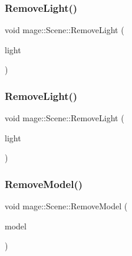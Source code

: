 \subsubsection{\texorpdfstring{Remove\+Light()}{RemoveLight()}\hspace{0.1cm}{\footnotesize\ttfamily [1/2]}}
{\footnotesize\ttfamily void mage\+::\+Scene\+::\+Remove\+Light (\begin{DoxyParamCaption}\item[{\hyperlink{namespacemage_a1e01ae66713838a7a67d30e44c67703e}{Shared\+Ptr}$<$ \hyperlink{namespacemage_a1724c6e6b6b5ba535cdd967cbbb4a669}{Omni\+Light\+Node} $>$}]{light }\end{DoxyParamCaption})\hspace{0.3cm}{\ttfamily [private]}}

\hypertarget{classmage_1_1_scene_a371c31d030990b9fa641271c4c733d87}{}\label{classmage_1_1_scene_a371c31d030990b9fa641271c4c733d87} 
\subsubsection{\texorpdfstring{Remove\+Light()}{RemoveLight()}\hspace{0.1cm}{\footnotesize\ttfamily [2/2]}}
{\footnotesize\ttfamily void mage\+::\+Scene\+::\+Remove\+Light (\begin{DoxyParamCaption}\item[{\hyperlink{namespacemage_a1e01ae66713838a7a67d30e44c67703e}{Shared\+Ptr}$<$ \hyperlink{namespacemage_aeed5dee4ff6c591eabb0e9114256df4a}{Spot\+Light\+Node} $>$}]{light }\end{DoxyParamCaption})\hspace{0.3cm}{\ttfamily [private]}}

\hypertarget{classmage_1_1_scene_a1b66a3d247eaa143234d15d72aa67a85}{}\label{classmage_1_1_scene_a1b66a3d247eaa143234d15d72aa67a85} 
\subsubsection{\texorpdfstring{Remove\+Model()}{RemoveModel()}}
{\footnotesize\ttfamily void mage\+::\+Scene\+::\+Remove\+Model (\begin{DoxyParamCaption}\item[{\hyperlink{namespacemage_a1e01ae66713838a7a67d30e44c67703e}{Shared\+Ptr}$<$ \hyperlink{classmage_1_1_model_node}{Model\+Node} $>$}]{model }\end{DoxyParamCaption})\hspace{0.3cm}{\ttfamily [private]}}

